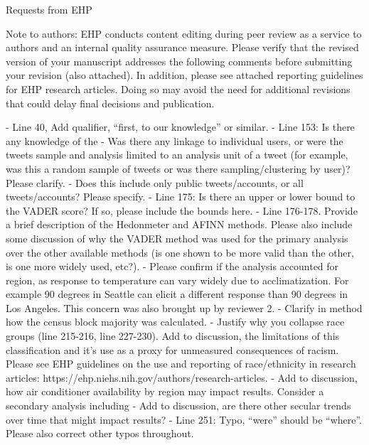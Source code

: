 

Requests from EHP

Note to authors: EHP conducts content editing during peer review as a service to authors and an internal quality assurance measure. Please verify that the revised version of your manuscript addresses the following comments before submitting your revision (also attached). In addition, please see attached reporting guidelines for EHP research articles. Doing so may avoid the need for additional revisions that could delay final decisions and publication.

- Line 40, Add qualifier, “first, to our knowledge” or similar.
- Line 153: Is there any knowledge of the %
- Was there any linkage to individual users, or were the tweets sample and analysis limited to an analysis unit of a tweet (for example, was this a random sample of tweets or was there sampling/clustering by user)? Please clarify.
- Does this include only public tweets/accounts, or all tweets/accounts? Please specify.
- Line 175: Is there an upper or lower bound to the VADER score? If so, please include the bounds here.
- Line 176-178. Provide a brief description of the Hedonmeter and AFINN methods. Please also include some discussion of why the VADER method was used for the primary analysis over the other available methods (is one shown to be more valid than the other, is one more widely used, etc?).
- Please confirm if the analysis accounted for region, as response to temperature can vary widely due to acclimatization. For example 90 degrees in Seattle can elicit a different response than 90 degrees in Los Angeles. This concern was also brought up by reviewer 2.
- Clarify in method how the census block majority was calculated.
- Justify why you collapse race groups (line 215-216, line 227-230). Add to discussion, the limitations of this classification and it’s use as a proxy for unmeasured consequences of racism. Please see EHP guidelines on the use and reporting of race/ethnicity in research articles: https://ehp.niehs.nih.gov/authors/research-articles.
- Add to discussion, how air conditioner availability by region may impact results. Consider a secondary analysis including %
- Add to discussion, are there other secular trends over time that might impact results?
- Line 251: Typo, “were” should be “where”. Please also correct other typos throughout.
